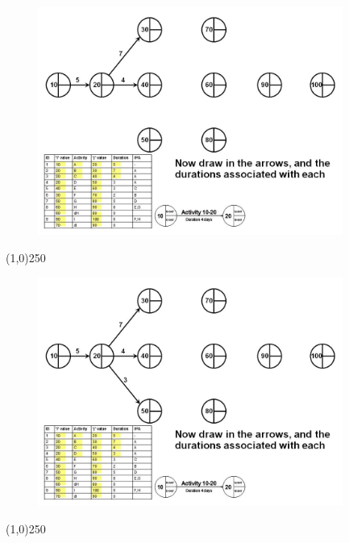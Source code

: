 \begin{frame}
\begin{figure}
	\centering
		\includegraphics[width = 10.0cm]{oldnotes/Slide93.jpg}
\end{figure}
\end{frame}
\begin{center}\line(1,0){250}\end{center}


\begin{frame}
\begin{figure}
	\centering
		\includegraphics[width = 10.0cm]{oldnotes/Slide94.jpg}
\end{figure}
\end{frame}
\begin{center}\line(1,0){250}\end{center}


